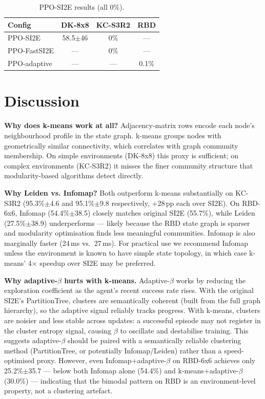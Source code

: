\documentclass[10pt,twocolumn]{article}
\newcommand{\fastsi}{FastSI2E}
\newcommand{\si}{SI2E}
\begin{document}
\begin{table}[h]
\centering
\caption{PPO-SI2E results (all 0\%).}
\label{tab:ppo}
\small
\begin{tabular}{lccc}
\toprule
Config & DK-8x8 & KC-S3R2 & RBD \\
\midrule
PPO-\si{}  & 58.5$\pm$46 & 0\% & --- \\
PPO-\fastsi{} & --- & 0\% & --- \\
PPO-adaptive  & --- & --- & 0.1\% \\
\bottomrule
\end{tabular}
\end{table}

\section{Discussion}

\textbf{Why does k-means work at all?}
Adjacency-matrix rows encode each node's neighbourhood profile in the state
graph. k-means groups nodes with geometrically similar connectivity, which
correlates with graph community membership. On simple environments (DK-8x8)
this proxy is sufficient; on complex environments (KC-S3R2) it misses the
finer community structure that modularity-based algorithms detect directly.

\textbf{Why Leiden vs. Infomap?}
Both outperform k-means substantially on KC-S3R2 (95.3\%$\pm$4.6 and 95.1\%$\pm$9.8
respectively, +28\,pp each over SI2E). On RBD-6x6, Infomap (54.4\%$\pm$38.5) closely
matches original SI2E (55.7\%), while Leiden (27.5\%$\pm$38.9) underperforms ---
likely because the RBD state graph is sparser and modularity optimisation finds less
meaningful communities. Infomap is also marginally faster (24\,ms vs.\ 27\,ms).
For practical use we recommend Infomap unless the environment is known to have
simple state topology, in which case k-means' 4$\times$ speedup over SI2E may be
preferred.

\textbf{Why adaptive-$\beta$ hurts with k-means.}
\label{sec:discussion}
Adaptive-$\beta$ works by reducing the exploration coefficient as the agent's
recent success rate rises. With the original \si{}'s PartitionTree, clusters are
semantically coherent (built from the full graph hierarchy), so the adaptive
signal reliably tracks progress. With k-means, clusters are noisier and less
stable across updates: a successful episode may not register in the cluster
entropy signal, causing $\beta$ to oscillate and destabilise training. This
suggests adaptive-$\beta$ should be paired with a semantically reliable
clustering method (PartitionTree, or potentially Infomap/Leiden) rather than
a speed-optimised proxy. However, even Infomap+adaptive-$\beta$ on RBD-6x6
achieves only 25.2\%$\pm$35.7 --- below both Infomap alone (54.4\%) and
k-means+adaptive-$\beta$ (30.0\%) --- indicating that the bimodal pattern on
RBD is an environment-level property, not a clustering artefact.
\end{document}
